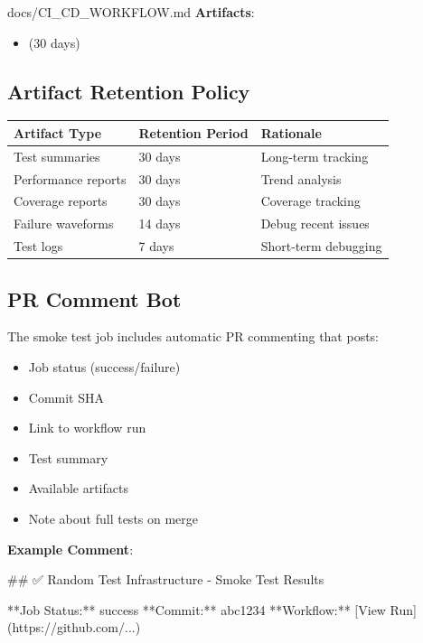 \begin{relocated}{docs/CI_CD_WORKFLOW.md}
\textbf{Artifacts}:

\begin{itemize}
\tightlist
\item
   (30 days)
\end{itemize}

\subsection{Artifact Retention Policy}\label{um:flow:ci-cd-workflow:artifact-retention-policy}

{
\begin{longtable}[]{@{}lll@{}}
\toprule\noalign{}
Artifact Type & Retention Period & Rationale \\
\midrule\noalign{}
\endhead
\bottomrule\noalign{}
\endlastfoot
Test summaries & 30 days & Long-term tracking \\
Performance reports & 30 days & Trend analysis \\
Coverage reports & 30 days & Coverage tracking \\
Failure waveforms & 14 days & Debug recent issues \\
Test logs & 7 days & Short-term debugging \\
\end{longtable}
}

\subsection{PR Comment Bot}\label{um:flow:ci-cd-workflow:pr-comment-bot}

The smoke test job includes automatic PR commenting that posts:

\begin{itemize}
\tightlist
\item
  Job status (success/\allowbreak{}failure)
\item
  Commit SHA
\item
  Link to workflow run
\item
  Test summary
\item
  Available artifacts
\item
  Note about full tests on merge
\end{itemize}

\textbf{Example Comment}:

\begin{textblock}
## ✅ Random Test Infrastructure - Smoke Test Results

**Job Status:** success
**Commit:** abc1234
**Workflow:** [View Run](https://github.com/...)


\end{textblock}
\end{relocated}
